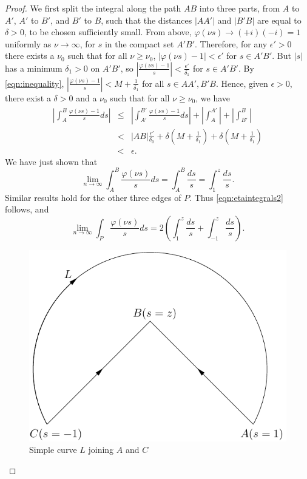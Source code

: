 \documentclass{article}
\begin{document}
\begin{proof}
We first split the integral along the path $AB$ into three parts, from $A$ to $A'$, $A'$ to $B'$, and $B'$ to $B$, such that the distances $|AA'|$ and $|B'B|$ are equal to $\delta>0$, to be chosen sufficiently small. 
From above, $\varphi(\nu s) \to (+i)(-i)=1$ uniformly as $\nu \to \infty$, for $s$ in the compact set $A'B'$. Therefore,
for any $\epsilon'>0$ there exists a $\nu_0$ such that for all $\nu \geq \nu_0$, $|\varphi(\nu s)-1|<\epsilon'$ for $s \in A'B'$. But $|s|$ has a minimum $\delta_1>0$ on $A'B'$, so $|\frac{\varphi(\nu s)-1}{s}|<\frac{\epsilon'}{\delta_1}$ for $s \in A'B'$. 
By \eqref{eqn:inequality}, $|\frac{\varphi(\nu s)-1}{s}|<M+\frac{1}{\delta_1}$ for all $s \in AA',B'B$. Hence,
given $\epsilon>0$, there exist a $\delta>0$ and a $\nu_0$ such that for all $\nu \geq \nu_0$, we have
\begin{eqnarray*}
|\int_A^B \frac{\varphi(\nu s)-1}{s}ds|&\leq&|\int_{A'}^{B'} \frac{\varphi(\nu s)-1}{s} ds|+|\int_A^{A'}|+|\int_{B'}^B|\\
&<&|AB|\frac{\epsilon'}{\delta_0}+\delta(M+\frac{1}{\delta_1})+\delta(M+\frac{1}{\delta_1})\\
&<&\epsilon.
\end{eqnarray*}
We have just shown that
\begin{equation}
\lim_{n \to \infty} \int_A^B \frac{\varphi(\nu s)}{s}ds=\int_A^B \frac{ds}{s}=\int_1^z \frac{ds}{s}.
\end{equation}
Similar results hold for the other three edges of $P$. Thus \eqref{eqn:etaintegrals2} follows, and
\[
\lim_{n \to \infty} \int_P \frac{\varphi(\nu s)}{s}ds=2(\int_1^z \frac{ds}{s}+\int_{-1}^z \frac{ds}{s}).
\]

\begin{figure}
\caption{Simple curve $L$ joining $A$ and $C$}
\begin{center}
\includegraphics[scale=0.75]{arc.pdf}
\end{center}
\label{figure:circle}
\end{figure}


\end{proof}
\end{document}
